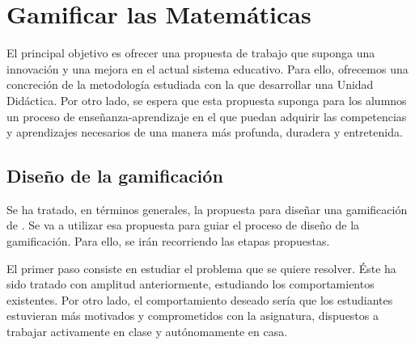


\chapter{Gamificar las Matemáticas}




El principal objetivo es ofrecer una propuesta de trabajo que suponga una innovación y una mejora en el actual sistema educativo.
%
Para ello, ofrecemos una concreción de la metodología estudiada con la que desarrollar una Unidad Didáctica.
% 
Por otro lado, se espera que esta propuesta suponga para los alumnos un proceso de enseñanza-aprendizaje en el que puedan adquirir las competencias y aprendizajes necesarios de una manera más profunda, duradera y entretenida.


\section{Diseño de la gamificación}

Se ha tratado, en términos generales, la propuesta para diseñar una gamificación de \cite{kapp2013gamification}. 
%
Se va a utilizar esa propuesta para guiar el proceso de diseño de la gamificación. 
%
Para ello, se irán recorriendo las etapas propuestas.

El primer paso consiste en estudiar el problema que se quiere resolver. 
%
Éste ha sido tratado con amplitud anteriormente, estudiando los comportamientos existentes. 
%
Por otro lado, el comportamiento deseado sería que los estudiantes estuvieran más motivados y comprometidos con la asignatura, dispuestos a trabajar activamente en clase y autónomamente en casa.

